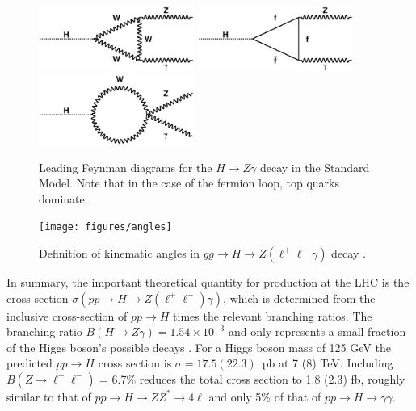 \begin{figure}[!htbp]
  \begin{center}
  {\includegraphics[width=2in]{figures/loop1}}
  {\includegraphics[width=2in]{figures/loop2}}
  {\includegraphics[width=2in]{figures/loop3}}
  \caption{Leading Feynman diagrams for the $H\rightarrow Z\gamma$
    decay in the Standard Model. Note that in the case of the fermion
    loop, top quarks dominate.} 
  \label{fig:feynman}
  \end{center}
\end{figure}

\begin{figure}
  \centering
  {\texttt{[image: figures/angles]}}
  \caption{Definition of kinematic angles in $gg\rightarrow H\rightarrow Z(\ell^{+}\ell^{-}\gamma)$ decay \cite{angular3}.}
  \label{fig:angles}
\end{figure}

In summary, the important theoretical quantity for \HToZg production at
the LHC is the cross-section $\sigma(pp \to H \to Z(\ell^+\ell^-)\gamma)$,
which is determined from the inclusive cross-section of $pp \to H$ times the
relevant branching ratios.
The branching ratio $B(H\to Z\gamma) = 1.54 \times 10^{-3}$ and only represents
a small fraction of the Higgs boson's possible decays
\cite{LHCHiggsCrossSectionWorkingGroup:2012vm, LHCHiggsCrossSectionWorkingGroup:2011ti}. For a Higgs boson mass of 125 GeV the predicted $pp \to H$ cross section is 
$\sigma = 17.5 (22.3)$~pb at 7 (8) TeV. Including $B(Z \to \ell^+\ell^-)$ = 6.7\%
\cite{PDG2012}
reduces the total cross section to 1.8 (2.3) fb, roughly similar to that of
$pp \to H \to ZZ^* \to 4\ell$ and only 5\% of that of $pp \to H \to \gamma\gamma$.
